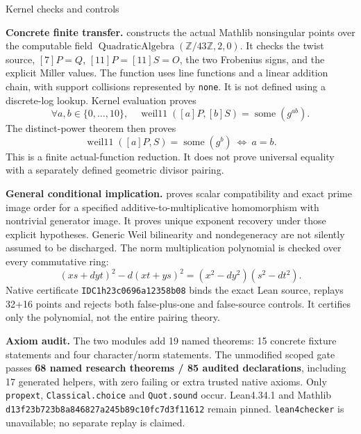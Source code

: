 \documentclass[10pt]{article}
\begin{document}
\newpage
\begin{center}{\Large Kernel checks and controls}\end{center}
\textbf{Concrete finite transfer.}  constructs
the actual Mathlib nonsingular points over the computable field
$\operatorname{QuadraticAlgebra}(\mathbb Z/43\mathbb Z,2,0)$. It checks
the twist source, $[7]P=Q$, $[11]P=[11]S=O$, the two Frobenius signs, and
the explicit Miller values. The function uses line functions and a linear
addition chain, with support collisions represented by \texttt{none}.
It is not defined using a discrete-log lookup. Kernel evaluation proves
\[
\forall a,b\in\{0,\ldots,10\},\quad
\operatorname{weil11}([a]P,[b]S)=\operatorname{some}(g^{ab}).
\]
The distinct-power theorem then proves
\[
\operatorname{weil11}([a]P,S)=\operatorname{some}(g^b)\ \Longleftrightarrow\ a=b.
\]
This is a finite actual-function reduction. It does not prove universal
equality with a separately defined geometric divisor pairing.

\textbf{General conditional implication.} 
proves scalar compatibility and exact prime image order for a specified
additive-to-multiplicative homomorphism with nontrivial generator image.
It proves unique exponent recovery under those explicit hypotheses. Generic
Weil bilinearity and nondegeneracy are not silently assumed to be discharged.
The norm multiplication polynomial is checked over every commutative ring:
\[
(xs+dyt)^2-d(xt+ys)^2=(x^2-dy^2)(s^2-dt^2).
\]
Native certificate \texttt{IDC1h23c0696a12358b08} binds the exact Lean source,
replays 32+16 points and rejects both false-plus-one and false-source controls.
It certifies only the polynomial, not the entire pairing theory.

\textbf{Axiom audit.} The two modules add 19 named theorems: 15 concrete
fixture statements and four character/norm statements. The unmodified scoped
gate passes \textbf{68 named research theorems / 85 audited declarations},
including 17 generated helpers, with zero failing or extra trusted native axioms.
Only \texttt{propext}, \texttt{Classical.choice} and \texttt{Quot.sound} occur.
Lean4.34.1 and Mathlib \texttt{d13f23b723b8a846827a245b89c10fc7d3f11612}
remain pinned. \texttt{lean4checker} is unavailable; no separate replay is claimed.
\end{document}
